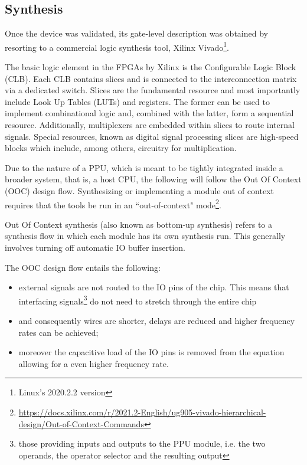 \subsection{Synthesis}

Once the device was validated, its gate-level description was obtained by resorting to a commercial logic synthesis tool, Xilinx Vivado\footnote{Linux's 2020.2.2 version}.





The basic logic element in the
FPGAs by Xilinx is the Configurable Logic Block (CLB). Each CLB contains
slices and is connected to the interconnection matrix via a dedicated switch. Slices are the fundamental resource and most importantly include Look Up Tables (LUTs) and registers. The former can be used to implement combinational logic and, combined with the latter, form a sequential resource. Additionally, multiplexers are embedded within slices to route internal signals.
Special resources, known as digital signal processing slices are high-speed blocks which include, among others, circuitry for multiplication.






Due to the nature of a PPU, which is meant to be tightly integrated inside a broader system, that is, a host CPU, the following will follow the Out Of Context (OOC) design flow.
Synthesizing or implementing a module out of context requires that the tools be run in an ``out-of-context" mode\footnote{\url{https://docs.xilinx.com/r/2021.2-English/ug905-vivado-hierarchical-design/Out-of-Context-Commands}}.

Out Of Context synthesis (also known as bottom-up synthesis) refers to a synthesis flow in which each module has its own synthesis run. This generally involves turning off automatic IO buffer insertion.

The OOC design flow entails the following:
\begin{itemize}
\item external signals are not routed to the IO pins of the chip. This means that interfacing signals\footnote{those providing inputs and outputs to the PPU module, i.e. the two operands, the operator selector and the resulting output} do not need to stretch through the entire chip
\item and consequently wires are shorter, delays are reduced and higher frequency rates can be achieved;
\item moreover the capacitive load of the IO pins is removed from the equation allowing for a even higher frequency rate.
\end{itemize}





